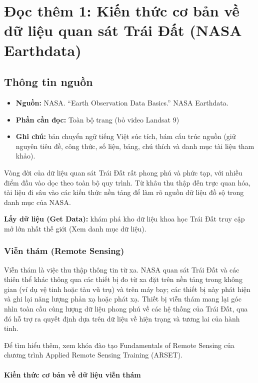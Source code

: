 \chapter{Đọc thêm 1: Kiến thức cơ bản về dữ liệu quan sát Trái Đất (NASA Earthdata)}
\label{ch:M6L2DocThem1}

\section{Thông tin nguồn}

\begin{itemize}
  \item \textbf{Nguồn:} NASA. ``Earth Observation Data Basics.'' NASA Earthdata.
  \item \textbf{Phần cần đọc:} Toàn bộ trang (bỏ video Landsat 9)
  \item \textbf{Ghi chú:} bản chuyển ngữ tiếng Việt súc tích, bám cấu trúc nguồn (giữ nguyên tiêu đề, công thức, số liệu, bảng, chú thích và danh mục tài liệu tham khảo).
\end{itemize}

Vòng đời của dữ liệu quan sát Trái Đất rất phong phú và phức tạp, với nhiều điểm đầu vào dọc theo toàn bộ quy trình. Từ khâu thu thập đến trực quan hóa, tài liệu đi sâu vào các kiến thức nền tảng để làm rõ nguồn dữ liệu đồ sộ trong danh mục của NASA.

\textbf{Lấy dữ liệu (Get Data):} khám phá kho dữ liệu khoa học Trái Đất truy cập mở lớn nhất thế giới (Xem danh mục dữ liệu).

\subsection{Viễn thám (Remote Sensing)}

Viễn thám là việc thu thập thông tin từ xa. NASA quan sát Trái Đất và các thiên thể khác thông qua các thiết bị đo từ xa đặt trên nền tảng trong không gian (ví dụ vệ tinh hoặc tàu vũ trụ) và trên máy bay; các thiết bị này phát hiện và ghi lại năng lượng phản xạ hoặc phát xạ. Thiết bị viễn thám mang lại góc nhìn toàn cầu cùng lượng dữ liệu phong phú về các hệ thống của Trái Đất, qua đó hỗ trợ ra quyết định dựa trên dữ liệu về hiện trạng và tương lai của hành tinh.

Để tìm hiểu thêm, xem khóa đào tạo Fundamentals of Remote Sensing của chương trình Applied Remote Sensing Training (ARSET).

\subsubsection{Kiến thức cơ bản về dữ liệu viễn thám}

